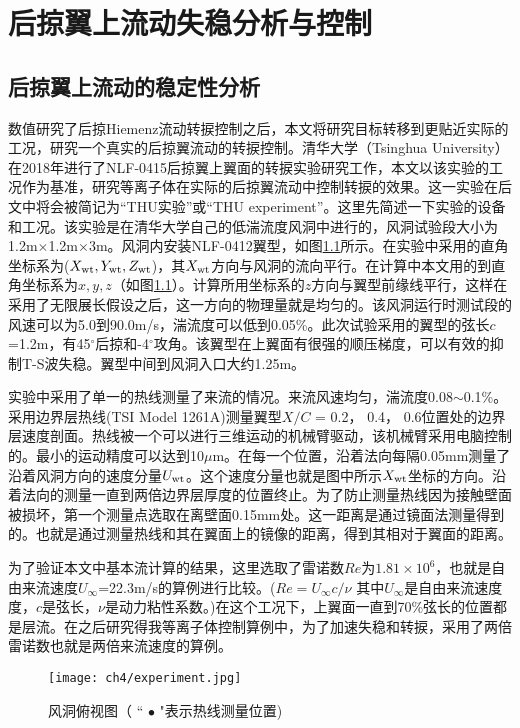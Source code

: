 \chapter{后掠翼上流动失稳分析与控制}
\section{后掠翼上流动的稳定性分析}
数值研究了后掠Hiemenz流动转捩控制之后，本文将研究目标转移到更贴近实际的工况，研究一个真实的后掠翼流动的转捩控制。清华大学（Tsinghua University）在2018年进行了NLF-0415后掠翼上翼面的转捩实验研究工作\cite{wang2018}，本文以该实验的工况作为基准，研究等离子体在实际的后掠翼流动中控制转捩的效果。这一实验在后文中将会被简记为``THU实验''或``THU experiment''。这里先简述一下实验的设备和工况。该实验是在清华大学自己的低湍流度风洞中进行的，风洞试验段大小为1.2m$\times$1.2m$\times$3m。风洞内安装NLF-0412翼型，如图\ref{f:experiment}所示。在实验中采用的直角坐标系为($X_{\rm wt},Y_{\rm wt},Z_{\rm wt}$)，其$X_{\rm wt}$方向与风洞的流向平行。在计算中本文用的到直角坐标系为$x,y,z$（如图\ref{f:experiment}）。计算所用坐标系的$z$方向与翼型前缘线平行，这样在采用了无限展长假设之后，这一方向的物理量就是均匀的。该风洞运行时测试段的风速可以为5.0到90.0m/s，湍流度可以低到0.05\%。此次试验采用的翼型的弦长$c$=1.2m，有45$^\circ$后掠和-4$^\circ$攻角。该翼型在上翼面有很强的顺压梯度，可以有效的抑制T-S波失稳\cite{Dagenhart1999}。翼型中间到风洞入口大约1.25m。

实验中采用了单一的热线测量了来流的情况。来流风速均匀，湍流度0.08$\sim$0.1\%。采用边界层热线(TSI Model 1261A)测量翼型$X/C$ = 0.2， 0.4， 0.6位置处的边界层速度剖面。热线被一个可以进行三维运动的机械臂驱动，该机械臂采用电脑控制的。最小的运动精度可以达到10$\mu$m。在每一个位置，沿着法向每隔0.05mm测量了沿着风洞方向的速度分量$U_{\rm wt}$。这个速度分量也就是图中所示$X_{\rm wt}$坐标的方向。沿着法向的测量一直到两倍边界层厚度的位置终止。为了防止测量热线因为接触壁面被损坏，第一个测量点选取在离壁面0.15mm处。这一距离是通过镜面法测量得到的。也就是通过测量热线和其在翼面上的镜像的距离，得到其相对于翼面的距离。

为了验证本文中基本流计算的结果，这里选取了雷诺数$Re$为$1.81\times10^6$，也就是自由来流速度$U_\infty$=22.3m/s的算例进行比较。($Re={U_\infty c}/{\nu}$ 其中$U_\infty$是自由来流速度度，$c$是弦长，$\nu$是动力粘性系数。)在这个工况下，上翼面一直到70\%弦长的位置都是层流。在之后研究得我等离子体控制算例中，为了加速失稳和转捩，采用了两倍雷诺数也就是两倍来流速度的算例。

\begin{figure}
  \centering
  \texttt{[image: ch4/experiment.jpg]}
  \caption{风洞俯视图（ `` $\bullet$ "表示热线测量位置)}\label{f:experiment}
\end{figure}

